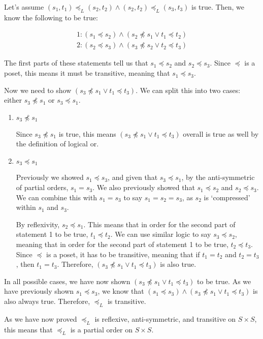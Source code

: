 \documentclass{article}
\begin{document}
\begin{enumerate}
Let's assume $(s_1, t_1) \preceq_{L} (s_2, t_2) \land (s_2, t_2) \preceq_{L} (s_3, t_3)$ is true. Then, we know the following to be true:

\vspace{-15pt}
\begin{align*}
1: (s_1 \preceq s_2) \land (s_2 \npreceq s_1 \lor t_1 \preceq t_2) \\
2: (s_2 \preceq s_3) \land (s_3 \npreceq s_2 \lor t_2 \preceq t_3) 
\end{align*}

The first parts of these statements tell us that $s_1 \preceq s_2$ and $s_2 \preceq s_3$. Since $\preceq$ is a poset, this means it must be transitive, meaning that $s_1 \preceq s_3$.

Now we need to show $(s_3 \npreceq s_1 \lor t_1 \preceq t_3)$. We can split this into two cases: either $s_3 \npreceq s_1$ or $s_3 \preceq s_1$.

\begin{enumerate}

\item $s_3 \npreceq s_1$

Since $s_3 \npreceq s_1$ is true, this means $(s_3 \npreceq s_1 \lor t_1 \preceq t_3)$ overall is true as well by the definition of logical or.

\item $s_3 \preceq s_1$

Previously we showed $s_1 \preceq s_3$, and given that $s_3 \preceq s_1$, by the anti-symmetric of partial orders, $s_1 = s_3$. We also previously showed that $s_1 \preceq s_2$ and $s_2 \preceq s_3$. We can combine this with $s_1 = s_3$ to say $s_1 = s_2 = s_3$, as $s_2$ is `compressed' within $s_1$ and $s_3$. 

By reflexivity, $s_2 \preceq s_1$. This means that in order for the second part of statement 1 to be true, $t_1 \preceq t_2$. We can use similar logic to say $s_3 \preceq s_2$, meaning that in order for the second part of statement 1 to be true, $t_2 \preceq t_3$. Since $\preceq$ is a poset, it has to be transitive, meaning that if $t_1 = t_2$ and $t_2 = t_3$, then $t_1 = t_3$. Therefore, $(s_3 \npreceq s_1 \lor t_1 \preceq t_3)$ is also true.

\end{enumerate}

In all possible cases, we have now shown $(s_3 \npreceq s_1 \lor t_1 \preceq t_3)$  to be true. As we have previously shown $s_1 \preceq s_3$, we know that $(s_1 \preceq s_3) \land (s_3 \npreceq s_1 \lor t_1 \preceq t_3)$ is also always true. Therefore, $\preceq_{L}$ is transitive.

\end{enumerate}

As we have now proved $\preceq_{L}$ is reflexive, anti-symmetric, and transitive on $S \times S$, this means that $\preceq_{L}$ is a partial order on $S \times S$.
\end{document}
